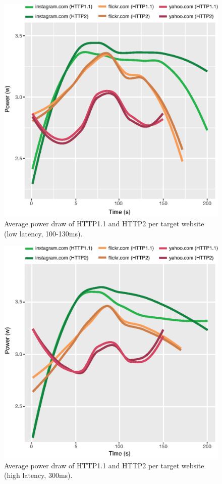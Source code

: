 \documentclass{article}
\begin{document}
\begin{figure}[h!]
    \centering
    \includegraphics[width=\linewidth]{images/average}
    \caption{Average power draw of HTTP1.1 and HTTP2 per target website (low latency, 100-130ms).}
    \label{fig:average}
\end{figure}

\begin{figure}[h!]
    \centering
    \includegraphics[width=0.98\linewidth]{images/average-vpn}
    \vspace{-3mm}
    \caption{Average power draw of HTTP1.1 and HTTP2 per target website (high latency, 300ms).}
    \label{fig:average-vpn}
\end{figure}
\end{document}
